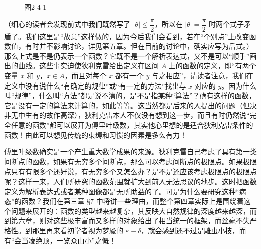 \begin{figure}[htbp]
\centering
{}
\caption*{图2-4-1}
\end{figure}

（细心的读者会发现前式中我们既然写了 $|\theta|\le\dfrac{\pi}{2}$，所以在 $|\theta|=\dfrac{\pi}{2}$ 时两个式子矛盾了。我们这里是“故意”这样做的，因为今后我们会看到，若在“个别点”上改变函数值，有时并不影响讨论，详见第五章。但在目前的讨论中，确实应写为后式。）那么上式是不是仍表示一个函数？它既不是一个解析表达式，又不是可以“顺手”画出的曲线。这些事实迫使狄利克雷给出定义在区间 $A$ 上的函数的定义，即“有两个变量 $x$ 和 $y$，$x\in A$，而且对每个 $x$ 都有一个 $y$ 与之相应”，请读者注意，我们在定义中没有说什么“有确定的规律”或“有一定的方法”找出与 $x$ 对应的 $y$。因为什么叫“规律”，什么叫“方法”都是说不清的，是不是指某种“算法”？确有这样的函数，它是没有一定的算法来计算的，如此等等。这当然都是后来的人提出的问题（但决非无中生有的故作高深），狄利克雷本人不仅没有想到这一步，而且有时仍然说“完全任意的函数”都可以展开为傅里叶级数，其实他心里想的是适合狄利克雷条件的函数！由此可以想见传统的束缚和习惯的因素是多么有力！

傅里叶级数确实是一个产生重大数学成果的来源。狄利克雷自己考虑了具有第一类间断点的函数，如果有无穷多个间断点，那么可以考虑间断点的极限点。如果极限点只有有限多个还好说，有无穷多个又怎么办？是不是还应该考虑极限点的极限点呢？这样一来，人们所研究的函数范围就扩大到前人无法思议的地步。这时把函数定义为解析表达式或者某种图像都是无所助益的了。可是为什么要研究这种“病态”的函数？我们在第三章 §7 中将讲一些理由，而整个第四章实际上是围绕着这个问题来展开的：函数的类型越来越复杂，其反映大自然规律的深度越来越深，而到第六章，则对这些极丰富而又多样的对象给出了相当统一的框架，而丝毫不失严格性。到那里再来看初学者视为梦魇的 $\varepsilon-\delta$，就会感到还不过是雕虫小技，而有“会当凌绝顶，一览众山小”之慨！

